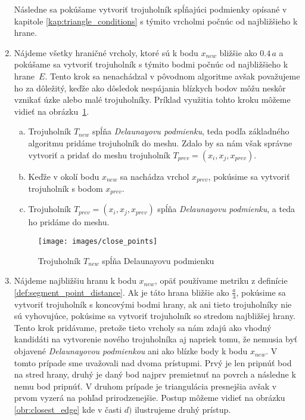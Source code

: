 \begin{enumerate}
{        Následne sa pokúšame vytvoriť trojuholník spĺňajúci podmienky opísané v kapitole 
        \ref{kap:triangle_conditions} s týmito vrcholmi počnúc od najbližšieho k hrane.
    }
    \item{
        Nájdeme všetky hraničné vrcholy, ktoré sú k bodu $x_{new}$ bližšie ako $0.4 \, a$
        a pokúšame sa vytvoriť trojuholník s týmito bodmi počnúc od najbližšieho k \mbox{hrane $E$}. 
        Tento krok sa nenachádzal v pôvodnom algoritme avšak považujeme ho za dôležitý, 
        keďže ako dôsledok nespájania blízkych bodov môžu neskôr vznikať úzke alebo malé trojuholníky. 
        Príklad využitia tohto kroku môžeme vidieť na \newline\mbox{obrázku \ref{obr:close_points}}. 
        \begin{enumerate}[a)]
            \item{
                Trojuholník $T_{new}$ spĺňa \textit{Delaunayovu podmienku}, teda podľa základného 
                algoritmu pridáme trojuholník do meshu. Zdalo by sa nám však správne vytvoriť a 
                pridať do meshu trojuholník $T_{prev} = (x_i, x_j, x_{prev})$. 
            }
            \item{
                Keďže v okolí bodu $x_{new}$ sa nachádza vrchol $x_{prev}$, pokúsime
                sa vytvoriť trojuholník s bodom $x_{prev}.$
            }
            \item{
                Trojuholník $T_{prev} = (x_i, x_j, x_{prev})$ spĺňa \textit{Delaunayovu podmienku},
                a teda ho pridáme do meshu. 
            }
        \end{enumerate}
        
        \begin{figure}
            \centerline{\texttt{[image: images/close\_points]}}
            \caption[Trojuholník $T_{new}$ spĺňajúci Delaunayovu podmienku]{Trojuholník $T_{new}$ spĺňa Delaunayovu podmienku}
            \label{obr:close_points}
        \end{figure}
    }
    \item{
        Nájdeme najbližšiu hranu k bodu $x_{new}$, opäť používame metriku z definície 
        \ref{def:segment_point_distance}. Ak je táto hrana bližšie ako $\frac{a}{3}$, 
        pokúsime sa vytvoriť trojuholník s koncovými bodmi hrany, ak ani tieto trojuholníky 
        nie sú vyhovujúce, pokúsime sa vytvoriť trojuholník so stredom najbližšej hrany.
        Tento krok pridávame, pretože
        tieto vrcholy sa nám zdajú ako vhodný kandidáti na vytvorenie nového trojuholníka
        aj napriek tomu, že nemusia byť objavené \textit{Delaunayovou podmienkou} ani ako 
        blízke body k bodu $x_{new}$. V tomto prípade sme uvažovali nad dvoma prístupmi. 
        Prvý je len pripnúť 
        bod na stred hrany, druhý je daný bod najprv premietnuť na povrch a následne k nemu bod 
        pripnúť. V druhom prípade je triangulácia presnejšia avšak v prvom vyzerá na pohľad 
        prirodzenejšie. Postup môžeme vidieť na obrázku \ref{obr:closest_edge} kde
        v časti $d)$ ilustrujeme druhý prístup.

}
\end{enumerate}
